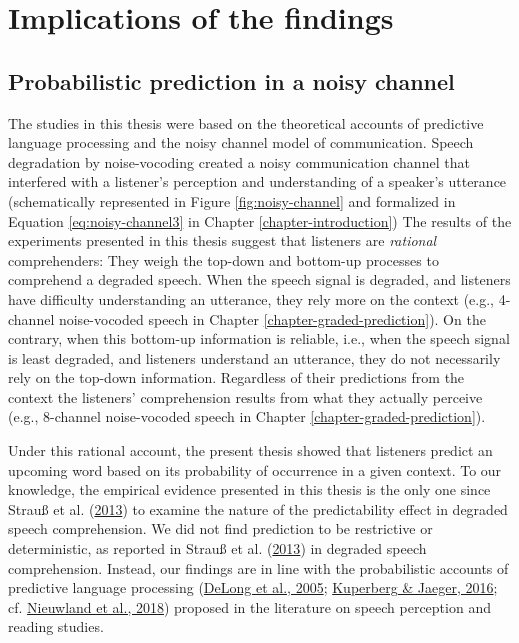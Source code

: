 \documentclass[a4paper, nobind]{templates/ociamthesis}
\begin{document}
\hypertarget{implications-of-the-findings}{%
\section{Implications of the findings}\label{implications-of-the-findings}}

\hypertarget{probabilistic-prediction-in-a-noisy-channel}{%
\subsection{Probabilistic prediction in a noisy channel}\label{probabilistic-prediction-in-a-noisy-channel}}

The studies in this thesis were based on the theoretical accounts of predictive language processing and the noisy channel model of communication.
Speech degradation by noise-vocoding created a noisy communication channel that interfered with a listener's perception and understanding of a speaker's utterance
(schematically represented in Figure \ref{fig:noisy-channel} and
formalized in Equation \eqref{eq:noisy-channel3} in Chapter \ref{chapter-introduction})
The results of the experiments presented in this thesis suggest that listeners are \emph{rational} comprehenders:
They weigh the top-down and bottom-up processes to comprehend a degraded speech.
When the speech signal is degraded, and listeners have difficulty understanding an utterance,
they rely more on the context (e.g., 4-channel noise-vocoded speech in Chapter \ref{chapter-graded-prediction}).
On the contrary, when this bottom-up information is reliable, i.e.,
when the speech signal is least degraded, and listeners understand an utterance,
they do not necessarily rely on the top-down information.
Regardless of their predictions from the context
the listeners' comprehension results from what they actually perceive (e.g., 8-channel noise-vocoded speech in Chapter \ref{chapter-graded-prediction}).

Under this rational account, the present thesis showed that listeners predict an upcoming word based on its probability of occurrence in a given context.
To our knowledge, the empirical evidence presented in this thesis is the only one since Strauß et al. (\protect\hyperlink{ref-Strauss2013}{2013}) to examine the nature of the predictability effect in degraded speech comprehension.
We did not find prediction to be restrictive or deterministic, as reported in Strauß et al. (\protect\hyperlink{ref-Strauss2013}{2013}) in degraded speech comprehension.
Instead, our findings are in line with the probabilistic accounts of predictive language processing (\protect\hyperlink{ref-Delong2005}{DeLong et al., 2005}; \protect\hyperlink{ref-Kuperberg2016}{Kuperberg \& Jaeger, 2016}; cf. \protect\hyperlink{ref-Nieuwland2018}{Nieuwland et al., 2018}) proposed in the literature on speech perception and reading studies.
\end{document}
